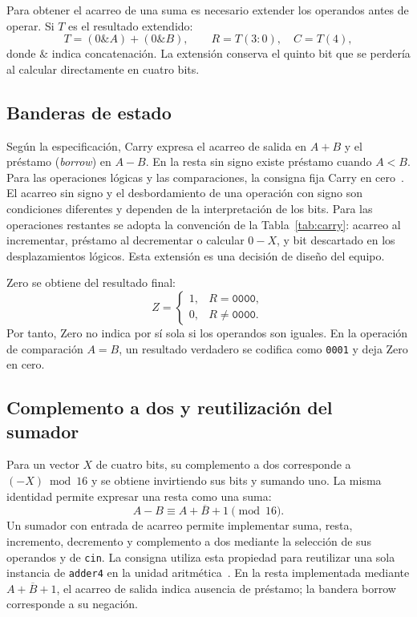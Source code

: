 Para obtener el acarreo de una suma es necesario extender los
operandos antes de operar. Si $T$ es el resultado extendido:
\begin{equation}
T=(0\mathbin{\&}A)+(0\mathbin{\&}B),\qquad
R=T(3\!:\!0),\quad C=T(4),
\end{equation}
donde $\&$ indica concatenación. La extensión conserva el quinto
bit que se perdería al calcular directamente en cuatro bits.

\subsection{Banderas de estado}
Según la especificación, Carry expresa el acarreo de salida en
$A+B$ y el préstamo (\textit{borrow}) en $A-B$. En la resta sin
signo existe préstamo cuando $A<B$. Para las operaciones lógicas
y las comparaciones, la consigna fija Carry en cero~\cite{guialab2}.
El acarreo sin signo y el desbordamiento de una operación con signo
son condiciones diferentes y dependen de la interpretación de los bits.
Para las operaciones restantes se adopta la convención de la
Tabla~\ref{tab:carry}: acarreo al incrementar, préstamo al decrementar
o calcular $0-X$, y bit descartado en los desplazamientos lógicos.
Esta extensión es una decisión de diseño del equipo.

Zero se obtiene del resultado final:
\begin{equation}
Z=\begin{cases}
1,& R=\texttt{0000},\\
0,& R\ne\texttt{0000}.
\end{cases}
\end{equation}
Por tanto, Zero no indica por sí sola si los operandos son iguales.
En la operación de comparación $A=B$, un resultado verdadero se
codifica como \texttt{0001} y deja Zero en cero.

\subsection{Complemento a dos y reutilización del sumador}
Para un vector $X$ de cuatro bits, su complemento a dos corresponde
a $(-X)\bmod16$ y se obtiene invirtiendo sus bits y sumando uno.
La misma identidad permite expresar una resta como una suma:
\begin{equation}
A-B\equiv A+\overline{B}+1\pmod{16}.
\end{equation}
Un sumador con entrada de acarreo permite implementar suma, resta,
incremento, decremento y complemento a dos mediante la selección de
sus operandos y de \texttt{cin}. La consigna utiliza esta propiedad
para reutilizar una sola instancia de \texttt{adder4} en la unidad
aritmética~\cite{guialab2}. En la resta implementada mediante
$A+\overline{B}+1$, el acarreo de salida indica ausencia de préstamo;
la bandera borrow corresponde a su negación.


